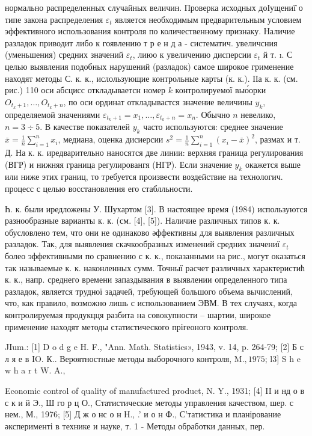 \documentclass[10pt]{article}
\begin{document}
нормально распределенных случайных величин. Проверка исходных доІущениї̈ о типе закона распределения $\varepsilon_{t}$ является необходимым предварительным условием эффективного использования контроля по количественному признаку. Наличие разладок приводит либо к гоявлению т р е н д а - систематич. увеличсния (уменьшения) средних значений $\varepsilon_{t}$, лиюо к увеличению дисперсии $\varepsilon_{t}$ й т. ı. С целью выявления подобных нарушений (разладок) самое широкое грименение находят методы С. к. к., ислользующие контрольные карты (к. к.). ІІа к. к. (см. рис.) 110 оси абсцисс откладываетсн номер $k$ контролируемої выо́орки $O_{t_{k}+1}, \ldots, O_{t_{k}+n}$, по оси ординат откладывастся значение величины $y_{k}$, определяемой значениями $\varepsilon_{t_{k}+1}=x_{1}, \ldots, \varepsilon_{t_{k}+n}=x_{n}$. Обычно $n$ невелико, $n=3 \div 5$. В качестве показателей $y_{k}$ часто используются: среднее значение $\bar{x}=\frac{1}{n} \sum_{i=1}^{n} x_{i}$, медиана, оценка дисиерсии $s^{2}=\frac{1}{n} \sum_{i=1}^{n}\left(x_{i}-\bar{x}\right)^{2}$, размах и т. Д. На к. к. иредварительно наносятся две линии: верхняя граница регулирования (ВГР) и нижняя граница регулировангя (НГР). Если значение $y_{k}$ окажется выше или ниже этих границ, то требуется произвести воздействие на технологич. процесс с целью восстановления его стаблльности.



Һ. к. были иредложены У. Шухартом [3]. В настоящее время (1984) используются разнообразные варианты к. к. (см. [4], [5]). Наличие различных типов к. к. обусловлено тем, что они не одинаково әффективны для выявления различных разладок. Так, для выявления скачкообразных изменений средних значениї $\varepsilon_{t}$ болео эффективными по сравнению с к. к., показанными на рис., могут оказаться так называемые к. к. наконленных сумм. Точныї расчет различных характеристић к. к., напр. среднего времени запаздывания в выявлении определенного типа разладок, является трудної задачей, требующей большого объема вычислений, что, как правило, возможно лишь с использованием ЭВМ. В тех случаях, когда контролируемая продукцця разбита на совокупности -- шартии, широкое применение находят методы статистического прігеоного контроля.



JIum.: [1] D o d g e H. F., "Ann. Math. Statistics», 1943, v. 14, p. 264-79; [2] Б с л я е в IO. К.. Вероятностные методы выборочного контроля, $\mathrm{M} ., 1975$; l3] S h e w h a r t W. A.,

Economic control of quality of manufactured product, N. Y., 1931; [4] II и нд о в с к и й Э., Ш го р ц О., Статистические методы управления качеством, шер. с нем., М., 1976; [5] Д ж о нс о н Н., .' и о н Ф., С'татистика и планірование әксперименті в технике и науке, т. 1 - Методы обработки данных, пер.
\end{document}
